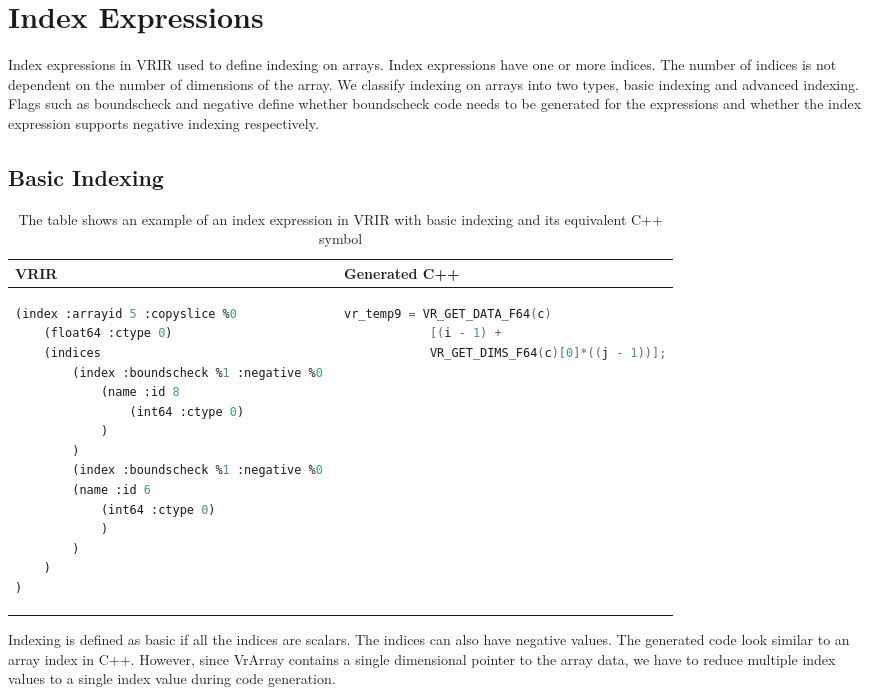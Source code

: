 \section{Index Expressions}
Index expressions in VRIR used to define indexing on arrays. Index expressions have one or more indices. The number of indices is not dependent on the number of dimensions of the array. We classify indexing on arrays into two types, basic indexing and advanced indexing. Flags such as boundscheck and negative define whether boundscheck code needs to be generated for the expressions and whether the index expression supports negative indexing respectively.
\subsection{Basic Indexing}
\label{subsec:basicindexing}
\begin{table}[htbp]
\centering
\begin{tabular}{|l|l|}
\hline

VRIR &  Generated C++ \\
\hline
{
\begin{lstlisting}[language=lisp,frame=none, numbers=none]
(index :arrayid 5 :copyslice %0
	(float64 :ctype 0)
	(indices 
		(index :boundscheck %1 :negative %0 
			(name :id 8 
				(int64 :ctype 0)
			)
		)
		(index :boundscheck %1 :negative %0 
   		(name :id 6 
   			(int64 :ctype 0)
			)
		)
	)
)
\end{lstlisting}
}
&
{
\begin{lstlisting}[language=c,frame=none, numbers=none]
vr_temp9 = VR_GET_DATA_F64(c) 
			[(i - 1) + 
			VR_GET_DIMS_F64(c)[0]*((j - 1))];
\end{lstlisting}
} \\
\hline
\end{tabular}
\caption[Basic array indexing example]{The table shows an example of an index expression in VRIR  with basic indexing and its equivalent C++ symbol}
\label{tab:basicIndex}
\end{table}
Indexing is defined as basic if all the indices are scalars. The indices can also have negative values. The generated code look similar to an array index in C++. However, since VrArray contains a single dimensional pointer to the array data, we have to reduce multiple index values to a single index value during code generation.
